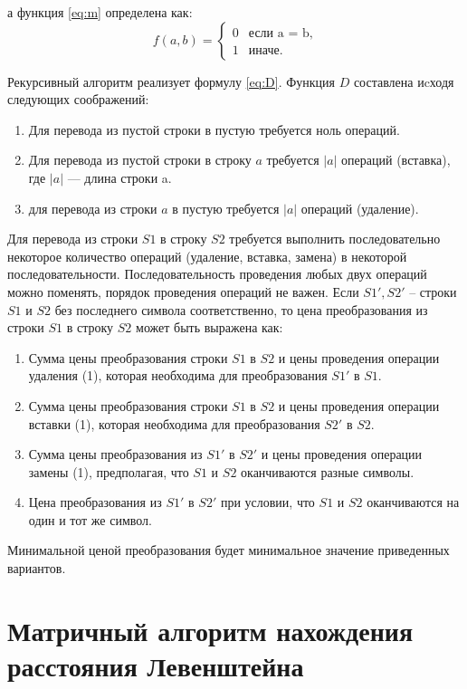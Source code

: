 а функция \ref{eq:m} определена как:
\begin{equation}
	\label{eq:m}
	f(a, b) = \begin{cases}
		0 &\text{если a = b,}\\
		1 &\text{иначе}.
	\end{cases}
\end{equation}

Рекурсивный алгоритм реализует формулу \ref{eq:D}.
Функция $D$ составлена иcходя следующих соображений:
\begin{enumerate}[label={\arabic*.}]
	\item Для перевода из пустой строки в пустую требуется ноль операций.
	\item Для перевода из пустой строки в строку $a$ требуется $|a|$ операций (вставка), где $|a|$ — длина строки a.
	\item для перевода из строки $a$ в пустую требуется $|a|$ операций (удаление).
\end{enumerate}
Для перевода из строки $S1$ в строку $S2$ требуется выполнить последовательно некоторое количество операций (удаление, вставка, замена) в некоторой последовательности. Последовательность проведения любых двух операций можно поменять, порядок проведения операций не важен. Если $S1', S2'$  -- строки $S1$ и $S2$ без последнего символа соответственно, то цена преобразования из строки $S1$ в строку $S2$ может быть выражена как:
	\begin{enumerate}[label={\arabic*.}]
		\item Сумма цены преобразования строки $S1$ в $S2$ и цены проведения операции удаления (1), которая необходима для преобразования $S1'$ в $S1$.
		\item Сумма цены преобразования строки $S1$ в $S2$  и цены проведения операции вставки (1), которая необходима для преобразования $S2'$ в $S2$.
		\item Сумма цены преобразования из $S1'$ в $S2'$ и цены проведения операции замены (1), предполагая, что $S1$ и $S2$ оканчиваются разные символы.
		\item Цена преобразования из $S1'$ в $S2'$ при условии, что $S1$ и $S2$ оканчиваются на один и тот же символ.
	\end{enumerate}

Минимальной ценой преобразования будет минимальное значение приведенных вариантов.

\section{Матричный алгоритм нахождения расстояния Левенштейна}


